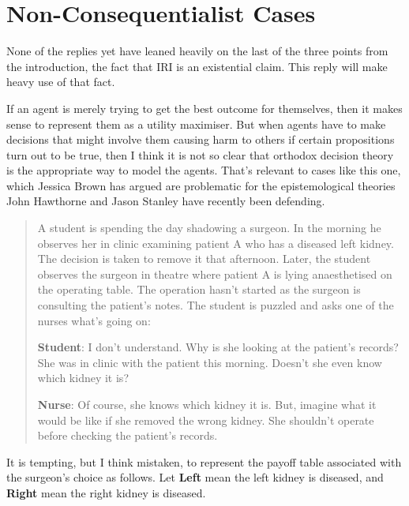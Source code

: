 \documentclass[oneside]{book}
\begin{document}
\section{Non-Consequentialist Cases}
None of the replies yet have leaned heavily on the last of the three points from the introduction, the fact that IRI is an existential claim. This reply will make heavy use of that fact.

If an agent is merely trying to get the best outcome for themselves, then it makes sense to represent them as a utility maximiser. But when agents have to make decisions that might involve them causing harm to others if certain propositions turn out to be true, then I think it is not so clear that orthodox decision theory is the appropriate way to model the agents. That's relevant to cases like this one, which Jessica Brown has argued are problematic for the epistemological theories John Hawthorne and Jason Stanley have recently been defending.

\begin{quote}
A student is spending the day shadowing a surgeon. In the morning he observes her in clinic examining patient A who has a diseased left kidney. The decision is taken to remove it that afternoon. Later, the student observes the surgeon in theatre where patient A is lying anaesthetised on the operating table. The operation hasn't started as the surgeon is consulting the patient's notes. The student is puzzled and asks one of the nurses what's going on: 

\textbf{Student}: I don't understand. Why is she looking at the patient's records? She was in clinic with the patient this morning. Doesn't she even know which kidney it is? 

\textbf{Nurse}: Of course, she knows which kidney it is. But, imagine what it would be like if she removed the wrong kidney. She shouldn't operate before checking the patient's records. \citep[1144-1145]{Brown2008-BROKAP}
\end{quote}

\noindent It is tempting, but I think mistaken, to represent the payoff table associated with the surgeon's choice as follows. Let \textbf{Left} mean the left kidney is diseased, and \textbf{Right} mean the right kidney is diseased.
\end{document}

